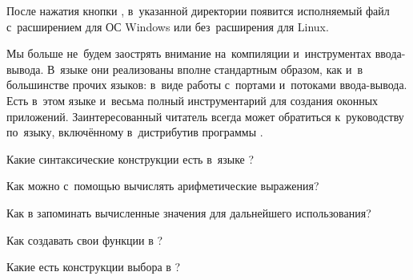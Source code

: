 После нажатия кнопки , в~указанной директории появится исполняемый файл с~расширением  для ОС Windows или без~расширения для Linux.

Мы больше не~будем заострять внимание на~компиляции и~инструментах ввода-вывода. В~языке \Scheme они реализованы вполне стандартным образом, как и~в большинстве прочих языков: в~виде работы с~портами и~потоками ввода-вывода. Есть в~этом языке и~весьма полный инструментарий для создания оконных приложений. Заинтересованный читатель всегда может обратиться к~руководству по~языку, включённому в~дистрибутив программы .

\begin{Queeze}
 \item Какие синтаксические конструкции есть в~языке \Scheme?

 \item Как можно с~помощью \Scheme вычислять арифметические выражения?

 \item Как в \Scheme запоминать вычисленные значения для дальнейшего использования?

 \item Как создавать свои функции в \Scheme?

 \item Какие есть конструкции выбора в \Scheme?
\end{Queeze}
